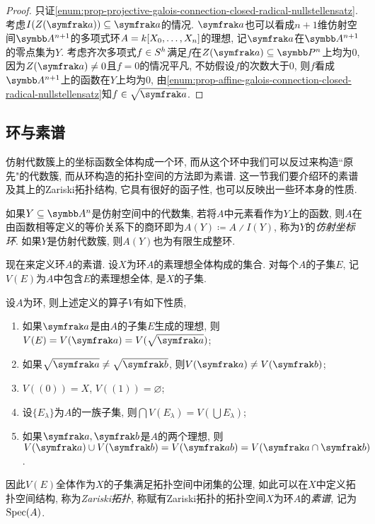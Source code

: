 \begin{proof}
  只证\ref{enum:prop-projective-galois-connection-closed-radical-nullstellensatz}. 考虑$I(Z(\ideal{a}))\subseteq\ideal{a}$的情况. $\ideal{a}$也可以看成$n+1$维仿射空间$\AF^{n+1}$的多项式环$A=k [X_0, \dotsc, X_n]$的理想, 记$\ideal{a}$在$\AF^{n+1}$的零点集为$Y$. 考虑齐次多项式$f\in S^h$满足$f$在$Z(\ideal{a})\subseteq \PP^n$上均为0, 因为$Z(\ideal{a})\neq 0$且$f=0$的情况平凡, 不妨假设$f$的次数大于0, 则$f$看成$\AF^{n+1}$上的函数在$Y$上均为0, 由\ref{enum:prop-affine-galois-connection-closed-radical-nullstellensatz}知$f\in\sqrt{\ideal{a}}$.
\end{proof}


\subsection{环与素谱}\label{sec:algebra-primespec}


仿射代数簇上的坐标函数全体构成一个环, 而从这个环中我们可以反过来构造``原先"的代数簇, 而从环构造的拓扑空间的方法即为素谱. 这一节我们要介绍环的素谱及其上的Zariski拓扑结构, 它具有很好的函子性, 也可以反映出一些环本身的性质.

如果$Y\subseteq \AF^n$是仿射空间中的代数集, 若将$A$中元素看作为$Y$上的函数, 则$A$在由函数相等定义的等价关系下的商环即为$A(Y)\coloneq A{\divslash}I(Y)$, 称为$Y$的\emph{仿射坐标环}. 如果$Y$是仿射代数簇, 则$A(Y)$也为有限生成整环.

现在来定义环$A$的素谱. 设$X$为环$A$的素理想全体构成的集合. 对每个$A$的子集$E$, 记$V(E)$为$A$中包含$E$的素理想全体, 是$X$的子集.

\begin{proposition}\label{prop:primespecclosedset}
  设$A$为环, 则上述定义的算子$V$有如下性质,
  \begin{enumerate}
    \item\label{enum:prop-prime-spec-closed-set-1} 如果$\ideal{a}$是由$A$的子集$E$生成的理想, 则$V(E)=V(\ideal{a})=V(\sqrt{\ideal{a}})$;
    \item\label{enum:prop-prime-spec-closed-set-2} 如果$\sqrt{\ideal{a}}\neq\sqrt{\ideal{b}}$, 则$V(\ideal{a})\neq V(\ideal{b})$;
    \item\label{enum:prop-prime-spec-closed-set-3} $V((0))=X$, $V((1))=\varnothing$;
    \item\label{enum:prop-prime-spec-closed-set-4} 设$\{E_\lambda\}$为$A$的一族子集, 则$\bigcap V(E_\lambda)=V(\bigcup E_\lambda)$;
    \item\label{enum:prop-prime-spec-closed-set-5} 如果$\ideal{a}, \ideal{b}$是$A$的两个理想, 则$V(\ideal{a})\cup V(\ideal{b})=V(\ideal{ab})= V(\ideal{a}\cap \ideal{b})$.
  \end{enumerate}
  因此$V(E)$全体作为$X$的子集满足拓扑空间中闭集的公理, 如此可以在$X$中定义拓扑空间结构, 称为\emph{Zariski拓扑}, 称赋有Zariski拓扑的拓扑空间$X$为环$A$的\emph{素谱}, 记为$\operatorname{Spec} (A)$.
\end{proposition}

